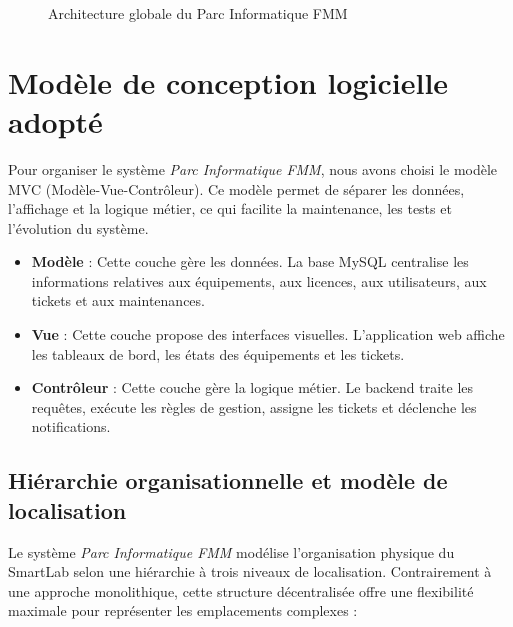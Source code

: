 \begin{figure}[H]
\caption{Architecture globale du Parc Informatique FMM}
\label{fig:architecture_parc_informatique}
\end{figure}

\section{Modèle de conception logicielle adopté}
\label{sec:modele_conception}
Pour organiser le système \textit{Parc Informatique FMM}, nous avons choisi le modèle MVC (Modèle-Vue-Contrôleur). Ce modèle permet de séparer les données, l’affichage et la logique métier, ce qui facilite la maintenance, les tests et l’évolution du système.

\begin{itemize}
    \item \textbf{Modèle} : Cette couche gère les données. La base MySQL centralise les informations relatives aux équipements, aux licences, aux utilisateurs, aux tickets et aux maintenances.
    \item \textbf{Vue} : Cette couche propose des interfaces visuelles. L'application web affiche les tableaux de bord, les états des équipements et les tickets.
    \item \textbf{Contrôleur} : Cette couche gère la logique métier. Le backend traite les requêtes, exécute les règles de gestion, assigne les tickets et déclenche les notifications.
\end{itemize}

\subsection{Hiérarchie organisationnelle et modèle de localisation}
\label{subsec:hierarchie_org}

Le système \textit{Parc Informatique FMM} modélise l'organisation physique du SmartLab selon une hiérarchie 
à trois niveaux de localisation. Contrairement à une approche monolithique, cette structure décentralisée 
offre une flexibilité maximale pour représenter les emplacements complexes :

